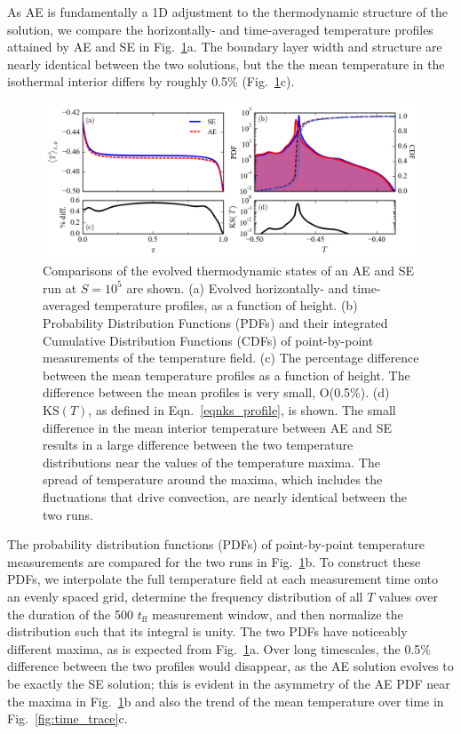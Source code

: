 \documentclass[aps, pre, onecolumn, nofootinbib, notitlepage, groupedaddress, amsfonts, amssymb, amsmath, longbibliography]{revtex4-1}
\newcommand{\KS}[1]{\ensuremath{\text{KS}(#1)}}
\begin{document}
As AE is fundamentally a 1D adjustment to the thermodynamic structure of the
solution, we compare the horizontally- and time-averaged temperature profiles 
attained by AE and SE in Fig.~\ref{fig:temp_comparison}a.  
The boundary layer width and structure are  
nearly identical between the two solutions, but the
the mean temperature in the isothermal interior differs by roughly 0.5\%
(Fig.~\ref{fig:temp_comparison}c). 

\begin{figure}[t]
\includegraphics[width=\textwidth]{./figs/temp_comparison.png}
\caption{Comparisons of the evolved thermodynamic states of an AE and SE run
at $S = 10^{5}$ are shown.  (a) Evolved horizontally- and time-averaged 
temperature profiles, as a function of height.
(b) Probability Distribution Functions (PDFs) and their integrated
Cumulative Distribution Functions (CDFs)
of point-by-point measurements of the temperature field.
(c) The percentage difference between the mean temperature profiles as a function of height.
The difference between the mean profiles is very small, O(0.5\%).
(d) $\KS{T}$, as defined in Eqn.~\ref{eqnks_profile}, is shown. The small
difference in the mean interior temperature between AE and SE
results in a large difference between the two temperature distributions near the values
of the temperature maxima.  The spread of temperature around the maxima, which includes the 
fluctuations that drive convection, are nearly identical between the two runs.
\label{fig:temp_comparison} }
\end{figure}

The probability distribution functions (PDFs)
of point-by-point temperature measurements are compared for the two runs
in Fig.~\ref{fig:temp_comparison}b. To construct these PDFs, 
we interpolate the full temperature field
at each measurement time onto an evenly spaced grid, determine the
frequency distribution of all $T$ values over the duration of the 500 $t_{\text{ff}}$
measurement window, and then normalize the
distribution such that its integral is unity.  The two PDFs have noticeably
different maxima, as is expected from Fig.~\ref{fig:temp_comparison}a. 
Over long timescales, the 0.5\% difference between the two profiles would
disappear, as the AE solution evolves to be exactly the SE solution; this
is evident in the asymmetry of the AE PDF near the maxima
in Fig.~\ref{fig:temp_comparison}b and also
the trend of the mean temperature over time in Fig.~\ref{fig:time_trace}c.
\end{document}
